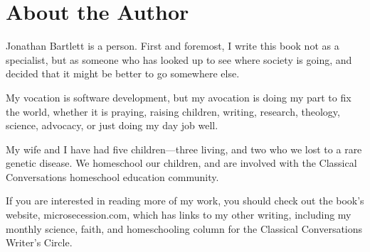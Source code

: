 \chapter*{About the Author}

Jonathan Bartlett is a person.  First and foremost, I write this book not
as a specialist, but as someone who has looked up to see where society is 
going, and decided that it might be better to go somewhere else.  

My vocation is software development, but my avocation is doing my part
to fix the world, whether it is praying, raising children, writing, research,
theology, science, advocacy, or just doing my day job well.

My wife and I have had five children---three living, and two who we lost
to a rare genetic disease.  We homeschool our children, and are involved
with the Classical Conversations homeschool education community.

If you are interested in reading more of my work, you should check out
the book's website, microsecession.com, which has links to my other
writing, including my monthly science, faith, and homeschooling column 
for the Classical Conversations Writer's Circle.

